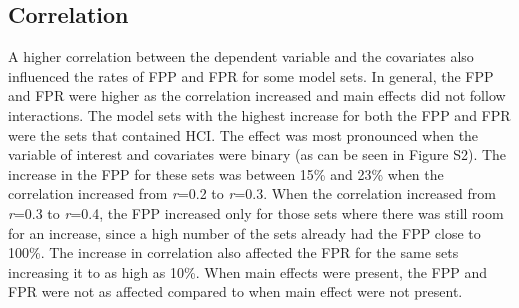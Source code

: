\subsection{Correlation}
A higher correlation between the dependent variable and the covariates also influenced the rates of FPP and FPR for some model sets. In general, the FPP and FPR were higher as the correlation increased and main effects did not follow interactions. The model sets with the highest increase for both the FPP and FPR were the sets that contained HCI. The effect was most pronounced when the variable of interest and covariates were binary (as can be seen in Figure S2). The increase in the FPP for these sets was between 15\% and 23\% when the correlation increased from \textit{r}=0.2 to \textit{r}=0.3. When the correlation increased from \textit{r}=0.3 to \textit{r}=0.4, the FPP increased only for those sets where there was still room for an increase, since a high number of the sets already had the FPP close to 100\%. The increase in correlation also affected the FPR for the same sets increasing it to as high as 10\%. When main effects were present, the FPP and FPR were not as affected compared to when main effect were not present.
